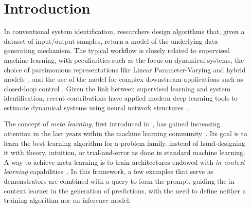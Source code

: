 \documentclass{article}
\begin{document}
\section{Introduction}


In conventional system identification, researchers design algorithms that, given a dataset of input/output samples, return a model of the underlying data-generating mechanism.  
The typical   workflow is   closely related to supervised machine learning, with peculiarities such as the focus on dynamical systems, the choice of parsimonious representations like Linear Parameter-Varying and  hybrid  models~\cite{lovera2013lpv, mejari2020identification},  and the use of the model for complex downstream applications such as closed-loop control \cite{bombois2006least, piga2019performance}. Given the link between supervised learning and system identification, recent contributions have applied modern deep learning tools to estimate dynamical systems using neural network structures~\cite{andersson2019deep,forgione2021continuous,masti2021learning,beintema2023deep}.

The concept of \emph{meta learning}, first introduced in~\cite{schmidhuber1987evolutionary}, has gained increasing attention in the last years within the machine learning community~\cite{hospedales2021meta}. Its goal is to learn the best learning algorithm for a problem family, instead of hand-designing it with theory, intuition, or trial-and-error as done in standard machine learning. %
A way to achieve meta learning is to train architectures endowed
with \emph{in-context learning} capabilities~\cite{garg2022can, kirsch2022general, dong2022survey}.
In this framework, a few examples that serve as demonstrators are combined with a query to form the prompt, guiding the in-context learner in the generation of predictions, with the need to define neither a training algorithm  nor an inference model. 
\end{document}
